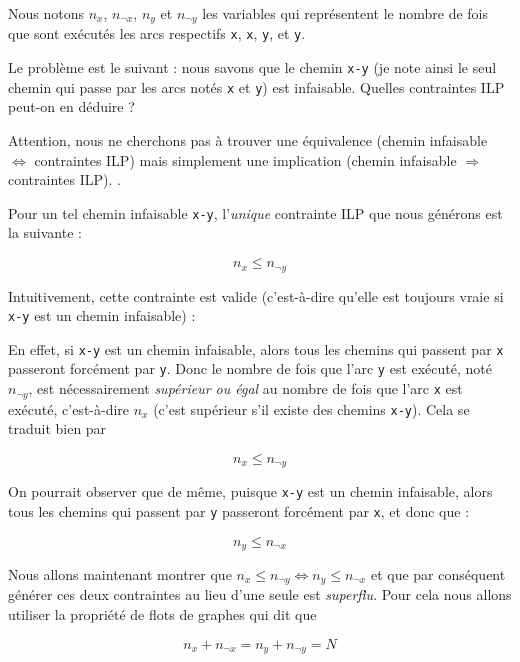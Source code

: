 \documentclass[french]{article}
\newcommand\ccc[1]{\color{red}{#1}\color{black}}
\begin{document}
  Nous notons $n_x$, $n_{\neg x}$, $n_y$ et $n_{\neg y}$ les variables qui représentent le nombre de fois que sont exécutés les arcs respectifs \texttt{x}, \texttt{\textlnot x}, \texttt{y}, et \texttt{\textlnot y}.

  Le problème est le suivant : nous savons que le chemin \texttt{x-y} (je note ainsi le seul chemin qui passe par les arcs notés \texttt{x} et \texttt{y}) est infaisable. Quelles contraintes ILP peut-on en déduire ?

  Attention, nous ne cherchons pas à trouver une équivalence (chemin infaisable $\Leftrightarrow$ contraintes ILP) mais simplement une implication (chemin infaisable $\Rightarrow$ contraintes ILP). \ccc{Nous verrons plus loin que la perte d'information lors du passage aux contraintes ILP est irrémédiable et qu'il est parfois impossible d'avoir une équivalence}.

  \medbreak

  Pour un tel chemin infaisable \texttt{x-y}, l'\textit{unique} contrainte ILP que nous générons est la suivante :

  \[ n_x \leq n_{\neg y} \]

  Intuitivement, cette contrainte est valide (c'est-à-dire qu'elle est toujours vraie si \texttt{x-y} est un chemin infaisable) :

  En effet, si \texttt{x-y} est un chemin infaisable, alors tous les chemins qui passent par \texttt{x} passeront forcément par \texttt{\textlnot y}. Donc le nombre de fois que l'arc \texttt{\textlnot y} est exécuté, noté $n_{\neg y}$, est nécessairement \textit{supérieur ou égal} au nombre de fois que l'arc \texttt{x} est exécuté, c'est-à-dire $n_x$ (c'est supérieur s'il existe des chemins \texttt{\textlnot x-y}). Cela se traduit bien par

  \[ n_x \leq n_{\neg y} \]

  On pourrait observer que de même, puisque \texttt{x-y} est un chemin infaisable, alors tous les chemins qui passent par \texttt{y} passeront forcément par \texttt{\textlnot x}, et donc que :

  \[ n_y \leq n_{\neg x} \]

  Nous allons maintenant montrer que $n_x \leq n_{\neg y} \Leftrightarrow n_y \leq n_{\neg x}$ et que par conséquent générer ces deux contraintes au lieu d'une seule est \textit{superflu}. Pour cela nous allons utiliser la propriété de flots de graphes qui dit que

  \[ n_x + n_{\neg x} = n_y + n_{\neg y} = N\]
\end{document}
